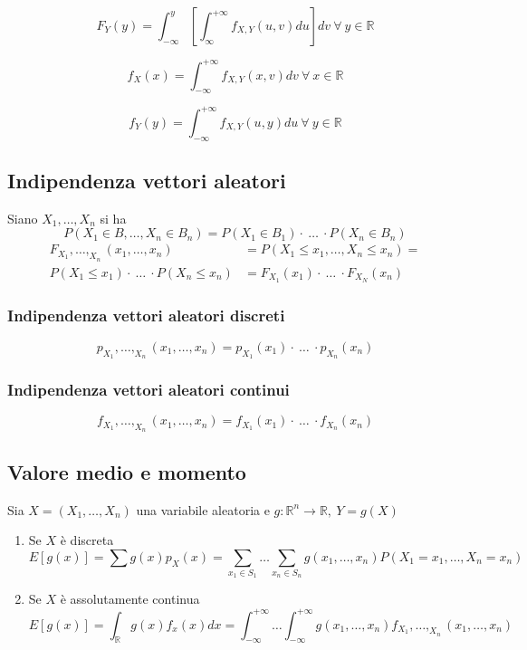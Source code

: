 $$
F_Y(y) = \int_{-\infty}^{y}\left[\int_{\infty}^{+\infty} f_{X,Y}(u,v) du\right] dv \ \forall \ y \in \mathbb{R}
$$

$$
f_X(x) = \int_{-\infty}^{+\infty} f_{X,Y}(x,v) dv \ \forall \ x \in \mathbb{R}
$$

$$
f_Y(y) = \int_{-\infty}^{+\infty} f_{X,Y}(u,y) du \ \forall \ y \in \mathbb{R}
$$

\subsection*{Indipendenza vettori aleatori}
Siano $X_1,\dots,X_n$ si ha
$$
P(X_1 \in B,\dots, X_n \in B_n) = P(X_1 \in B_1) \cdot \ \dots \ \cdot P(X_n \in B_n)
$$
\begin{align*}
F_{X_1}, \dots, _{X_n}(x_1, \dots, x_n) &= P(X_1 \le x_1, \dots, X_n \le x_n) =\\ 
P(X_1 \le x_1)\cdot \ \dots \ \cdot P(X_n \le x_n) &= 
F_{X_1}(x_1) \cdot \ \dots \ \cdot F_{X_N}(x_n)
\end{align*}

\subsubsection*{Indipendenza vettori aleatori discreti}
$$
p_{X_1},\dots,_{X_n}(x_1,\dots,x_n) = p_{X_1}(x_1) \cdot \ \dots \ \cdot p_{X_n}(x_n)
$$

\subsubsection*{Indipendenza vettori aleatori continui}
$$
f_{X_1},\dots,_{X_n}(x_1,\dots,x_n) = f_{X_1}(x_1) \cdot \ \dots \ \cdot f_{X_n}(x_n)
$$

\subsection*{Valore medio e momento}
Sia $X= (X_1,\dots,X_n)$ una variabile aleatoria e $g: \mathbb{R}^n \to \mathbb{R}, \ Y = g(X)$
\begin{enumerate}
    \item Se $X$ è discreta
    $$
    E[g(x)] = \sum g(x)p_X(x) = \sum_{x_1 \in S_1} \dots \sum_{x_n \in S_n}
    g(x_1,\dots,x_n)P(X_1=x_1,\dots,X_n=x_n)
    $$
    \item Se $X$ è assolutamente continua
    $$
    E[g(x)] = \int_{\mathbb{R}} g(x)f_x(x) dx = \int_{-\infty}^{+\infty} \dots \int_{-\infty}^{+\infty}
    g(x_1,\dots,x_n)f_{X_1},\dots,_{X_n}(x_1,\dots,x_n)
    $$
\end{enumerate}

